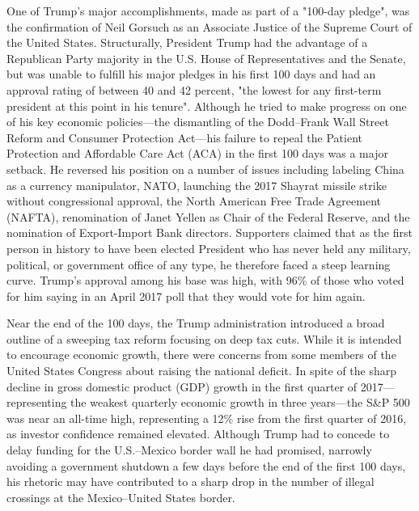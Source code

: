 One of Trump's major accomplishments, made as part of a "100-day
pledge", was the confirmation of Neil Gorsuch as an Associate Justice of
the Supreme Court of the United States. Structurally, President Trump
had the advantage of a Republican Party majority in the U.S. House of
Representatives and the Senate, but was unable to fulfill his major
pledges in his first 100 days and had an approval rating of between 40
and 42 percent, "the lowest for any first-term president at this point
in his tenure". Although he tried to make progress on one of his key
economic policies---the dismantling of the Dodd--Frank Wall Street
Reform and Consumer Protection Act---his failure to repeal the Patient
Protection and Affordable Care Act (ACA) in the first 100 days was a
major setback. He reversed his position on a number of issues including
labeling China as a currency manipulator, NATO, launching the 2017
Shayrat missile strike without congressional approval, the North
American Free Trade Agreement (NAFTA), renomination of Janet Yellen as
Chair of the Federal Reserve, and the nomination of Export-Import Bank
directors. Supporters claimed that as the first person in history to
have been elected President who has never held any military, political,
or government office of any type, he therefore faced a steep learning
curve. Trump's approval among his base was high, with 96\% of those who
voted for him saying in an April 2017 poll that they would vote for him
again.

Near the end of the 100 days, the Trump administration introduced a
broad outline of a sweeping tax reform focusing on deep tax cuts. While
it is intended to encourage economic growth, there were concerns from
some members of the United States Congress about raising the national
deficit. In spite of the sharp decline in gross domestic product (GDP)
growth in the first quarter of 2017---representing the weakest quarterly
economic growth in three years---the S\&P 500 was near an all-time high,
representing a 12\% rise from the first quarter of 2016, as investor
confidence remained elevated. Although Trump had to concede to delay
funding for the U.S.--Mexico border wall he had promised, narrowly
avoiding a government shutdown a few days before the end of the first
100 days, his rhetoric may have contributed to a sharp drop in the
number of illegal crossings at the Mexico--United States border.

